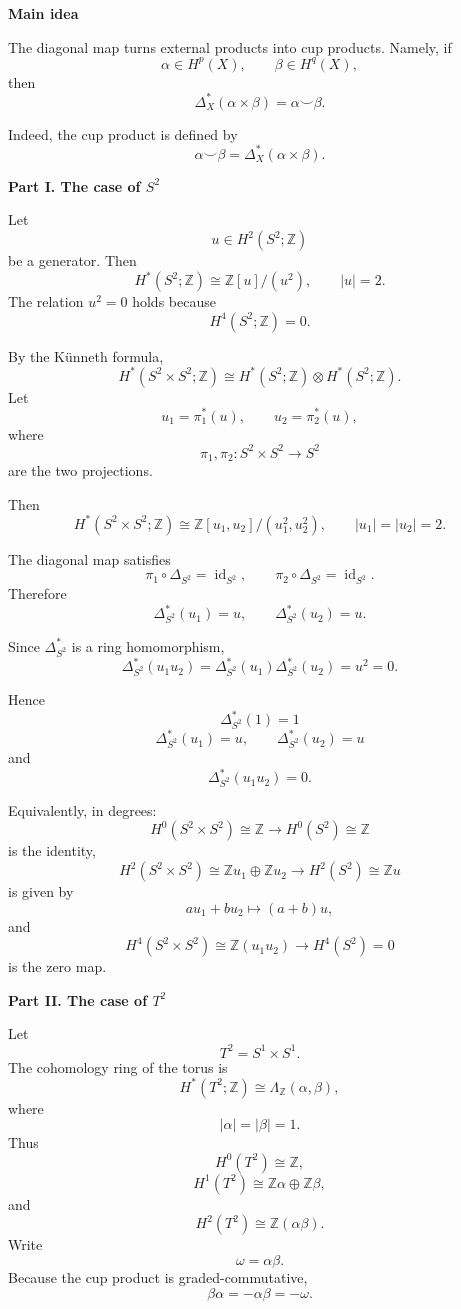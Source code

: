 \begin{solution}

\medskip
\noindent\textbf{Main idea}\par
\smallskip


The diagonal map turns external products into cup products. Namely, if
\[
\alpha\in H^p(X),
\qquad
\beta\in H^q(X),
\]
then
\[
\Delta_X^*(\alpha\times \beta)
=
\alpha\smile \beta.
\]

Indeed, the cup product is defined by
\[
\alpha\smile \beta
=
\Delta_X^*(\alpha\times \beta).
\]


\medskip
\noindent\textbf{Part I. The case of \(S^2\)}\par
\smallskip


Let
\[
u\in H^2(S^2;\mathbb Z)
\]
be a generator. Then
\[
H^*(S^2;\mathbb Z)
\cong
\mathbb Z[u]/(u^2),
\qquad
|u|=2.
\]
The relation \(u^2=0\) holds because
\[
H^4(S^2;\mathbb Z)=0.
\]

By the Künneth formula,
\[
H^*(S^2\times S^2;\mathbb Z)
\cong
H^*(S^2;\mathbb Z)\otimes H^*(S^2;\mathbb Z).
\]
Let
\[
u_1=\pi_1^*(u),
\qquad
u_2=\pi_2^*(u),
\]
where
\[
\pi_1,\pi_2:S^2\times S^2\to S^2
\]
are the two projections.

Then
\[
H^*(S^2\times S^2;\mathbb Z)
\cong
\mathbb Z[u_1,u_2]/(u_1^2,u_2^2),
\qquad
|u_1|=|u_2|=2.
\]

The diagonal map satisfies
\[
\pi_1\circ \Delta_{S^2}=\operatorname{id}_{S^2},
\qquad
\pi_2\circ \Delta_{S^2}=\operatorname{id}_{S^2}.
\]
Therefore
\[
\Delta_{S^2}^*(u_1)=u,
\qquad
\Delta_{S^2}^*(u_2)=u.
\]

Since \(\Delta_{S^2}^*\) is a ring homomorphism,
\[
\Delta_{S^2}^*(u_1u_2)
=
\Delta_{S^2}^*(u_1)\Delta_{S^2}^*(u_2)
=
u^2
=
0.
\]

Hence
\[
\boxed{
	\Delta_{S^2}^*(1)=1
}
\]
\[
\boxed{
	\Delta_{S^2}^*(u_1)=u,
	\qquad
	\Delta_{S^2}^*(u_2)=u
}
\]
and
\[
\boxed{
	\Delta_{S^2}^*(u_1u_2)=0.
}
\]

Equivalently, in degrees:
\[
H^0(S^2\times S^2)\cong \mathbb Z
\longrightarrow
H^0(S^2)\cong \mathbb Z
\]
is the identity,
\[
H^2(S^2\times S^2)\cong \mathbb Z u_1\oplus \mathbb Z u_2
\longrightarrow
H^2(S^2)\cong \mathbb Z u
\]
is given by
\[
au_1+bu_2\longmapsto (a+b)u,
\]
and
\[
H^4(S^2\times S^2)\cong \mathbb Z(u_1u_2)
\longrightarrow
H^4(S^2)=0
\]
is the zero map.


\medskip
\noindent\textbf{Part II. The case of \(T^2\)}\par
\smallskip


Let
\[
T^2=S^1\times S^1.
\]
The cohomology ring of the torus is
\[
H^*(T^2;\mathbb Z)
\cong
\Lambda_{\mathbb Z}(\alpha,\beta),
\]
where
\[
|\alpha|=|\beta|=1.
\]
Thus
\[
H^0(T^2)\cong \mathbb Z,
\]
\[
H^1(T^2)\cong \mathbb Z\alpha\oplus \mathbb Z\beta,
\]
and
\[
H^2(T^2)\cong \mathbb Z(\alpha\beta).
\]
Write
\[
\omega=\alpha\beta.
\]
Because the cup product is graded-commutative,
\[
\beta\alpha=-\alpha\beta=-\omega.
\]


\end{solution}
